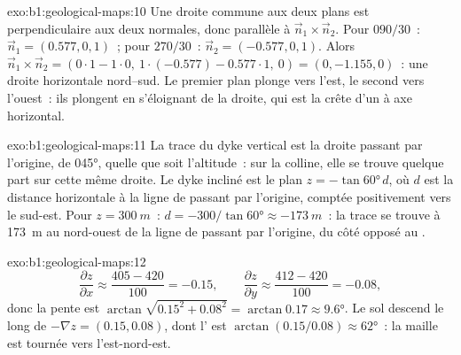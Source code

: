 \begin{solution}{exo:b1:geological-maps:10}
Une droite commune aux deux plans est perpendiculaire aux deux normales, donc
parallèle à $\vec n_1 \times \vec n_2$. Pour $090/30$~: $\vec n_1 = (0.577, 0,
1)$~; pour $270/30$~: $\vec n_2 = (-0.577, 0, 1)$. Alors $\vec n_1 \times \vec n_2
= (0\cdot 1 - 1\cdot 0,\ 1\cdot(-0.577) - 0.577\cdot 1,\ 0) = (0, -1.155,
0)$~: une droite horizontale nord--sud. Le premier plan plonge vers l'est, le
second vers l'ouest~: ils plongent en s'éloignant de la droite, qui est la crête
d'un  à axe horizontal.
\end{solution}

\begin{solution}{exo:b1:geological-maps:11}
La trace du dyke vertical est la droite passant par l'origine, de 
\ang{045}, quelle que soit l'altitude~: sur la colline, elle se trouve quelque
part sur cette même droite. Le dyke incliné est le plan $z = -\tan\ang{60}\,d$,
où $d$ est la distance horizontale à la ligne de  passant par
l'origine, comptée positivement vers le sud-est. Pour $z = \qty{300}{m}$~:
$d = -300/\tan\ang{60}
\approx \qty{-173}{m}$~: la trace se trouve à \qty{173}{m} au nord-ouest de la
ligne de  passant par l'origine, du côté opposé au .
\end{solution}

\begin{solution}{exo:b1:geological-maps:12}
\[
  \frac{\partial z}{\partial x} \approx \frac{405 - 420}{100} = -0.15, \qquad
  \frac{\partial z}{\partial y} \approx \frac{412 - 420}{100} = -0.08,
\]
donc la pente est $\arctan\sqrt{0.15^2 + 0.08^2} = \arctan 0.17 \approx
\ang{9.6}$. Le sol
descend le long de $-\nabla z = (0.15, 0.08)$, dont l' est
$\arctan(0.15/0.08) \approx \ang{62}$~: la maille est tournée vers
l'est-nord-est.
\end{solution}

